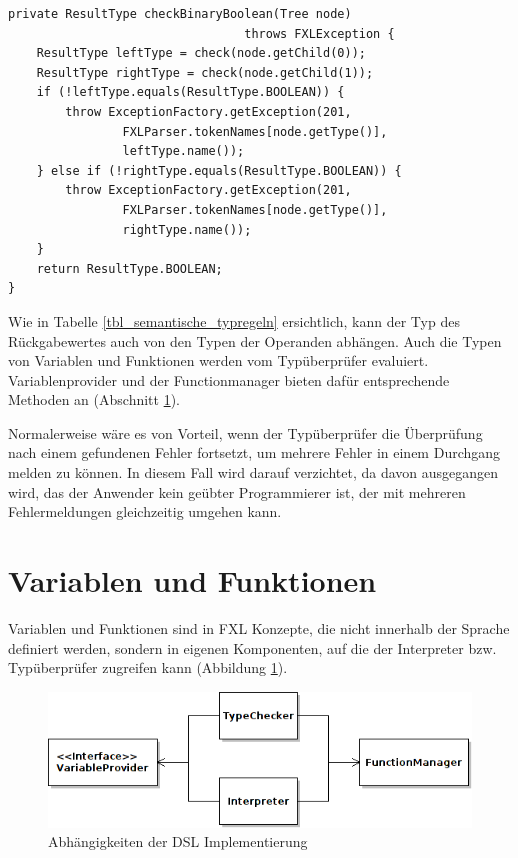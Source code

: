 \begin{lstlisting}[float = htbp,caption={Typ\-über\-prü\-fung der binären booleschen Operatoren},label=listing_check_binary_boolean]
private ResultType checkBinaryBoolean(Tree node)
                                 throws FXLException {
	ResultType leftType = check(node.getChild(0));
	ResultType rightType = check(node.getChild(1));
	if (!leftType.equals(ResultType.BOOLEAN)) {
		throw ExceptionFactory.getException(201,
				FXLParser.tokenNames[node.getType()],
				leftType.name());
	} else if (!rightType.equals(ResultType.BOOLEAN)) {
		throw ExceptionFactory.getException(201,
				FXLParser.tokenNames[node.getType()],
				rightType.name());
	}
	return ResultType.BOOLEAN;
}
\end{lstlisting}	

Wie in Tabelle \ref{tbl_semantische_typregeln} ersichtlich, kann der Typ des Rückgabewertes auch von den Typen der Operanden abhängen. Auch die Typen von Variablen und Funktionen werden vom Typüberprüfer evaluiert. Variablenprovider und der Functionmanager bieten dafür ent\-sprech\-ende Methoden an (Abschnitt \ref{section_implementierung_variablen_und_funktionen}).

Normalerweise wäre es von Vorteil, wenn der Typüberprüfer die Überprüfung nach einem gefundenen Fehler fortsetzt, um mehrere Fehler in einem Durchgang melden zu können. In diesem Fall wird darauf verzichtet, da davon ausgegangen wird, das der Anwender kein geübter Programmierer ist, der mit mehreren Fehlermeldungen gleichzeitig umgehen kann.

\section{Variablen und Funktionen}
\label{section_implementierung_variablen_und_funktionen}

Variablen und Funktionen sind in FXL Konzepte, die nicht innerhalb der Sprache definiert werden, sondern in eigenen Komponenten, auf die der Interpreter bzw. Typüberprüfer zugreifen kann (Abbildung \ref{figure_dsl_overview}). 

\begin{figure}[h]
\begin{center}
 
\includegraphics[scale=0.5]{figures/uml_dsl_overview_neu}

\end{center}

\caption{Abhängigkeiten der DSL Implementierung}
\label{figure_dsl_overview}
\end{figure}



